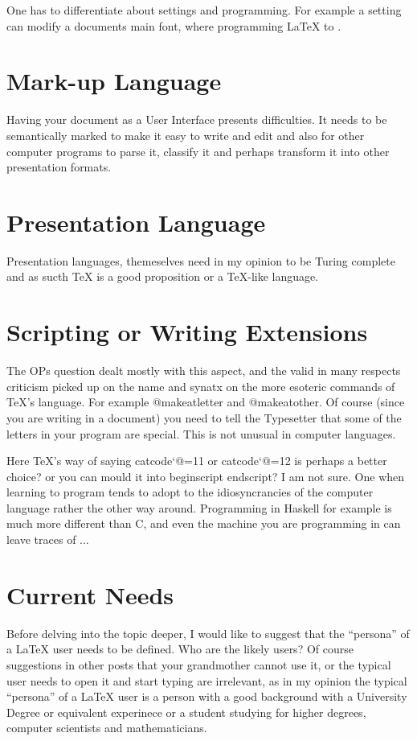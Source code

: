 \documentclass[pagestyleset=scrheadings]{scrbook}
\begin{document}
One has to differentiate about settings and programming. For example a setting can modify a documents main font, where programming LaTeX to .


\section{Mark-up Language}

Having your document as a User Interface presents difficulties. It needs to be semantically marked to make it easy to write and edit and also for other computer programs to parse it, classify it and perhaps transform it into other presentation formats.

\section{Presentation Language}

Presentation languages, themeselves need in my opinion to be Turing complete and as sucth TeX is a good proposition or a TeX-like language. 

\section{Scripting or Writing Extensions}

The OPs question dealt mostly with this aspect, and the valid in many respects criticism picked up on the name and synatx on the more esoteric commands of TeX’s language. For example @makeatletter and @makeatother.  Of course (since you are writing in  a document) you need to tell the Typesetter that some of the letters in your program are special. This is not unusual in computer languages. 

Here TeX’s way of saying catcode`@=11 or catcode`@=12 is perhaps a better choice? or you can mould it into begin{script} end{script}? I am not sure. One when learning to program tends to adopt to the idiosyncrancies of the computer language rather the other way around. Programming in Haskell for example is much more different than C, and even the machine you are programming in can leave traces of ...



\section{Current Needs}

Before delving into the topic deeper, I would like to suggest that the “persona” of a LaTeX user needs to be defined. Who are the likely users? Of course suggestions in other posts that your grandmother cannot use it, or the typical user needs to open it and start typing are irrelevant, as in my opinion the typical “persona” of a LaTeX user is a person with a good background with a University Degree or equivalent experinece or a student studying for higher degrees, computer scientists and mathematicians. 
\end{document}
